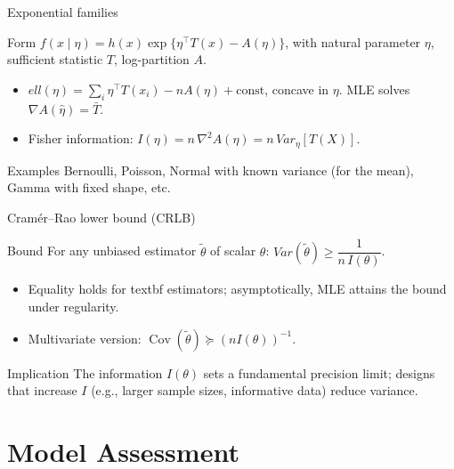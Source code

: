 \documentclass{beamer}
\def\Var{Var}%
\def\ell{ell}%
\newcommand{\Var}{\operatorname{Var}}
\newcommand{\1}{\mathbf{1}}
\newcommand{\robustcmd}[1]{\csname #1\endcsname}
\providecommand{\textbf}[1]{\robustcmd{textbf}{#1}}
\begin{document}
\begin{frame}{Exponential families}
  \begin{block}{Form}
    \(f(x\mid\eta)=h(x)\exp\{\eta^\top T(x)-A(\eta)\}\), with natural parameter \(\eta\), sufficient statistic \(T\), log-partition \(A\).
  \end{block}
  \begin{itemize}
    \item \(\ell(\eta)=\sum_i \eta^\top T(x_i) - nA(\eta)+\text{const}\), concave in \(\eta\). MLE solves \(\nabla A(\hat\eta)=\bar T\).
    \item Fisher information: \(I(\eta)=n\,\nabla^2 A(\eta)=n\,\Var_\eta[T(X)]\).
  \end{itemize}
  \begin{exampleblock}{Examples}
    Bernoulli, Poisson, Normal with known variance (for the mean), Gamma with fixed shape, etc.
  \end{exampleblock}
\end{frame}

\begin{frame}{Cram\'er--Rao lower bound (CRLB)}
  \begin{block}{Bound}
    For any unbiased estimator \(\tilde\theta\) of scalar \(\theta\): \(\Var(\tilde\theta) \ge \dfrac{1}{n\,I(\theta)}\).
  \end{block}
  \begin{itemize}
    \item Equality holds for \textbf{efficient} estimators; asymptotically, MLE attains the bound under regularity.
    \item Multivariate version: \(\operatorname{Cov}(\tilde\theta) \succeq (n I(\theta))^{-1}\).
  \end{itemize}
  \begin{exampleblock}{Implication}
    The information \(I(\theta)\) sets a fundamental precision limit; designs that increase \(I\) (e.g., larger sample sizes, informative data) reduce variance.
  \end{exampleblock}
\end{frame}

\section{Model Assessment}
\end{document}
